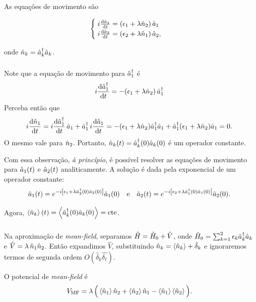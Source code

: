 \documentclass[a4paper,fleqn,12pt]{article}
\begin{document}
\subsubsection{}

As equações de movimento são
\begin{ceqn}
\begin{align} \label{eq:eom-int}
\begin{cases}
\; i \dv{\hat{a}_1}{t} = (\epsilon_1 + \lambda \hat{n}_2) \, \hat{a}_1 \\
\; i \dv{\hat{a}_2}{t} = (\epsilon_2 + \lambda \hat{n}_1) \, \hat{a}_2,
\end{cases}
\end{align}
\end{ceqn}
onde $\hat{n}_k = \hat{a}^\dagger_k \hat{a}_k$.

\subsubsection{}

Note que a equação de movimento para $\hat{a}_1^\dagger$ é
$$
i \dv{\hat{a}^\dagger_1}{t} = - (\epsilon_1 + \lambda \hat{n}_2) \, \hat{a}^\dagger_1
$$
Perceba então que
$$
i \dv{\hat{n}_1}{t} = i \dv{\hat{a}^\dagger_1}{t} \, \hat{a}_1 + \hat{a}^\dagger_1 \, i \dv{\hat{a}_1}{t} =
- (\epsilon_1 + \lambda \hat{n}_2) \hat{a}^\dagger_1 \hat{a}_1 + \hat{a}^\dagger_1 (\epsilon_1 + \lambda \hat{n}_2) \hat{a}_1
= 0.
$$
O mesmo vale para $\hat{n}_2$. Portanto, $\hat{n}_k(t) = \hat{a}_k^\dagger(0) \hat{a}_k(0)$ é um operador constante.

Com essa observação, \textit{à princípio}, é possível resolver as equações de movimento para $\hat{a}_1(t)$ e $\hat{a}_2(t)$ analiticamente. A solução é dada pela exponencial de um operador constante:
$$
\hat{a}_1(t) = e^{-i\qty[\epsilon_1 + \lambda \hat{a}_2^\dagger(0) \hat{a}_2(0)]} \hat{a}_1(0) \quad \mathrm{e} \quad
\hat{a}_2(t) = e^{-i\qty[\epsilon_2 + \lambda \hat{a}_1^\dagger(0) \hat{a}_1(0)]} \hat{a}_2(0).
$$

Agora, $\ev{\nn_k}(t) = \ev{\a^\dagger_k(0) \a_k(0)} = \cte$.

\subsubsection{}

Na aproximação de \textit{mean-field}, separamos $\hat{H} = \hat{H}_0 + \hat{V}$, onde $\hat{H}_0 = \sum_{k=1}^2 \epsilon_k \hat{a}^\dagger_k \hat{a}_k$ e $\hat{V} = \lambda \, \hat{n}_1 \hat{n}_2$. Então expandimos $\hat{V}$, substituindo $\nn_k = \ev{\nn_k} + \hat{\delta}_k$ e ignoraremos termos de segunda ordem $O(\hat{\delta}_k \hat{\delta_\ell})$.

O potencial de \textit{mean-field} é
$$
V_{\text{MF}} = \lambda \, \Big(\ev{\nn_1} \nn_2 + \ev{\nn_2} \nn_1 - \ev{\nn_1}\ev{\nn_2}\Big).
$$
\end{document}
